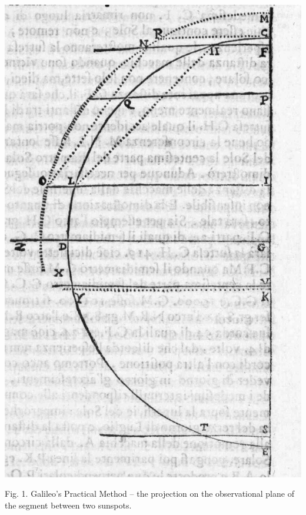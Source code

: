 \begin{artengenv}
{\centering  \includegraphics{Sierotowiczorg-img001.jpg} \par}
{\centering
Fig. 1. Galileo’s Practical Method -- the projection on the observational plane of the segment between two sunspots. 
\par}


\end{artengenv}
